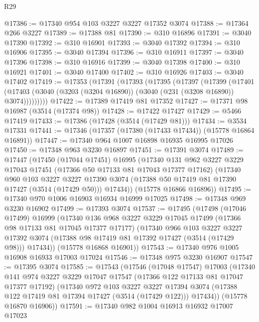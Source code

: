 \begin{lexlean}{R29}
\begin{coremodule}
@17386 := @17340 @954 @103 @3227 @3227 @17352 @3074
@17388 := @17364 @266 @3227
@17389 := @17388 @81
@17390 := @310 @16896
@17391 := @3040 @17390
@17392 := @310 @16901
@17393 := @3040 @17392
@17394 := @310 @16906
@17395 := @3040 @17394
@17396 := @310 @16911
@17397 := @3040 @17396
@17398 := @310 @16916
@17399 := @3040 @17398
@17400 := @310 @16921
@17401 := @3040 @17400
@17402 := @310 @16926
@17403 := @3040 @17402
@17419 := @17353
    (@17391
      (@17393
        (@17395
          (@17397
            (@17399
              (@17401
                (@17403 (@3040 (@3203 (@3204 @16890)) (@3040 (@231 (@3208 @16890)) @3074)))))))))
@17422 := @17389 @17419 @81 @17352
@17427 := @17371 @98 @16987 (@3514 (@17374 @98))
@17428 := @17422 @17427
@17429 := @5466 @17419
@17433 := @17386 (@17428 (@3514 (@17429 @81)))
@17434 := @3534 @17331
@17441 := @17346 (@17357 (@17380 (@17433 @17434)) (@15778 @16864 @16891))
@17447 := @17340 @964 @1007 @16898 @16935 @16995 @17026
@17450 := @17348 @963 @3230 @16897
@17451 := @17391 @3074
@17489 := @17447
    (@17450
      (@17044 @17451)
      @16995
      (@17340
        @131
        @962
        @3227
        @3229
        @17043
        @17451
        (@17366 @50 @17133 @81 @17043 @17377 @17162)
        (@17340
          @960
          @103
          @3227
          @3227
          @17390
          @3074
          (@17388 @50 @17419 @81 @17390 @17427 (@3514 (@17429 @50)))
          @17434))
      (@15778 @16866 @16896))
@17495 := @17340 @970 @1006 @16903 @16934 @16999 @17025
@17498 := @17348 @969 @3230 @16902
@17499 := @17393 @3074
@17537 := @17495
    (@17498
      (@17046 @17499)
      @16999
      (@17340
        @136
        @968
        @3227
        @3229
        @17045
        @17499
        (@17366 @98 @17133 @81 @17045 @17377 @17177)
        (@17340
          @966
          @103
          @3227
          @3227
          @17392
          @3074
          (@17388 @98 @17419 @81 @17392 @17427 (@3514 (@17429 @98)))
          @17434))
      (@15778 @16868 @16901))
@17543 := @17340 @976 @1005 @16908 @16933 @17003 @17024
@17546 := @17348 @975 @3230 @16907
@17547 := @17395 @3074
@17585 := @17543
    (@17546
      (@17048 @17547)
      @17003
      (@17340
        @141
        @974
        @3227
        @3229
        @17047
        @17547
        (@17366 @122 @17133 @81 @17047 @17377 @17192)
        (@17340
          @972
          @103
          @3227
          @3227
          @17394
          @3074
          (@17388 @122 @17419 @81 @17394 @17427 (@3514 (@17429 @122)))
          @17434))
      (@15778 @16870 @16906))
@17591 := @17340 @982 @1004 @16913 @16932 @17007 @17023

\end{coremodule}
\end{lexlean}
